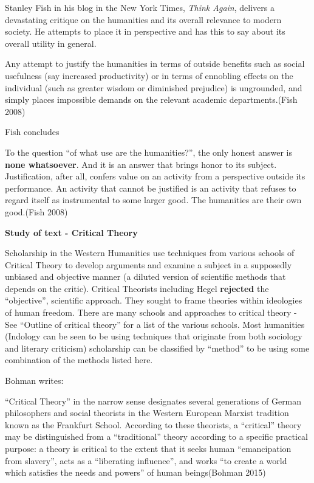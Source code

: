 Stanley Fish in his blog in the New York Times, {\sl Think Again}, delivers a devastating critique on the humanities and its overall relevance to modern society. He attempts to place it in perspective and has this to say about its overall utility in general. 
\begin{myquote}
Any attempt to justify the humanities in terms of outside benefits such as social usefulness (say increased productivity) or in terms of ennobling effects on the individual (such as greater wisdom or diminished prejudice) is ungrounded, and simply places impossible demands on the relevant academic departments.\hfill (Fish 2008)
\end{myquote}

Fish concludes
\begin{myquote}
To the question ``of what use are the humanities?'', the only honest answer is {\bf none whatsoever}. And it is an answer that brings honor to its subject. Justification, after all, confers value on an activity from a perspective outside its performance. An activity that cannot be justified is an activity that refuses to regard itself as instrumental to some larger good. The humanities are their own good.\hfill (Fish 2008)
\end{myquote}

{\bf Study of text - Critical Theory}

Scholarship in the Western Humanities use techniques from various schools of Critical Theory to develop arguments and examine a subject in a supposedly unbiased and objective manner (a diluted version of scientific methods that depends on the critic). Critical Theorists including Hegel {\bf rejected} the ``objective'', scientific approach. They sought to frame theories within ideologies of human freedom. There are many schools and approaches to critical theory - See ``Outline of critical theory'' for a list of the various schools. Most humanities (Indology can be seen to be using techniques that originate from both sociology and literary criticism) scholarship can be classified by ``method'' to be using some combination of the methods listed here.

Bohman writes:
\begin{myquote}
``Critical Theory'' in the narrow sense designates several generations of German philosophers and social theorists in the Western European Marxist tradition known as the Frankfurt School. According to these theorists, a ``critical'' theory may be distinguished from a ``traditional'' theory according to a specific practical purpose: a theory is critical to the extent that it seeks human ``emancipation from slavery'', acts as a ``liberating influence'', and works ``to create a world which satisfies the needs and powers'' of human beings\hfill (Bohman 2015)
\end{myquote}

